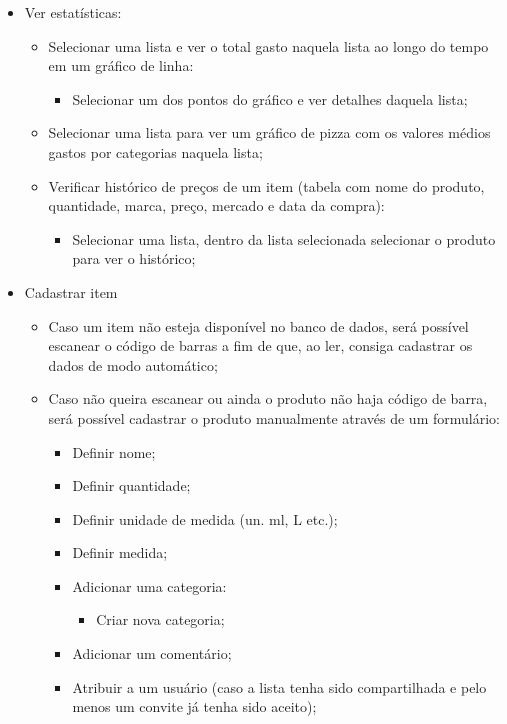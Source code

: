 \begin{itemize}
	\item Ver estatísticas:
		\begin{itemize}
			\item Selecionar uma lista e ver o total gasto naquela lista ao longo do tempo em um gráfico de linha:
				\begin{itemize}
					\item Selecionar um dos pontos do gráfico e ver detalhes daquela lista;
				\end{itemize}
			\item Selecionar uma lista para ver um gráfico de pizza com os valores médios gastos por categorias naquela lista;
			\item Verificar histórico de preços de um item (tabela com nome do produto, quantidade, marca, preço, mercado e data da compra):
				\begin{itemize}
					\item Selecionar uma lista, dentro da lista selecionada selecionar o produto para ver o histórico;
				\end{itemize}
		\end{itemize}
		
	\item Cadastrar item
		\begin{itemize}
			\item Caso um item não esteja disponível no banco de dados, será possível escanear o código de barras a fim de que, ao ler, consiga cadastrar os dados de modo automático;
			\item Caso não queira escanear ou ainda o produto não haja código de barra, será possível cadastrar o produto manualmente através de um formulário:
				\begin{itemize}
					\item Definir nome;
					\item Definir quantidade;
					\item Definir unidade de medida (un. ml, L etc.);
					\item Definir medida;
					\item Adicionar uma categoria:
						\begin{itemize}
							\item Criar nova categoria;
						\end{itemize}
					\item Adicionar um comentário;
					\item Atribuir a um usuário (caso a lista tenha sido compartilhada e pelo menos um convite já tenha sido aceito);
				\end{itemize}
		\end{itemize}
		

\end{itemize}
